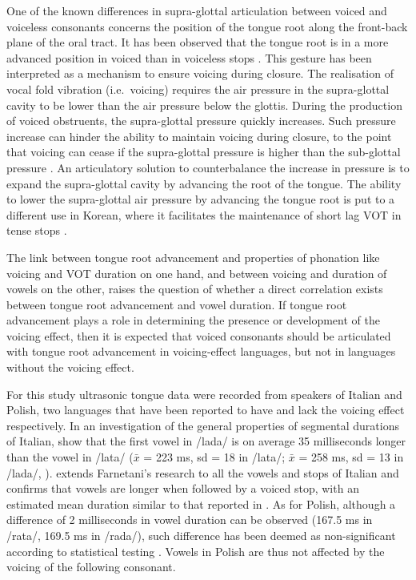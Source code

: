 \documentclass[authoryear, 5p]{elsarticle}
\begin{document}
One of the known differences in supra-glottal articulation between
voiced and voiceless consonants concerns the position of the tongue root
along the front-back plane of the oral tract. It has been observed that
the tongue root is in a more advanced position in voiced than in
voiceless stops \citep{kent1969,perkell1969,westbury1983}. This gesture
has been interpreted as a mechanism to ensure voicing during closure.
The realisation of vocal fold vibration (i.e.~voicing) requires the air
pressure in the supra-glottal cavity to be lower than the air pressure
below the glottis. During the production of voiced obstruents, the
supra-glottal pressure quickly increases. Such pressure increase can
hinder the ability to maintain voicing during closure, to the point that
voicing can cease if the supra-glottal pressure is higher than the
sub-glottal pressure \citep{ohala2011}. An articulatory solution to
counterbalance the increase in pressure is to expand the supra-glottal
cavity by advancing the root of the tongue. The ability to lower the
supra-glottal air pressure by advancing the tongue root is put to a
different use in Korean, where it facilitates the maintenance of short
lag VOT in tense stops \citep{ahn2016}.

The link between tongue root advancement and properties of phonation
like voicing and VOT duration on one hand, and between voicing and
duration of vowels on the other, raises the question of whether a direct
correlation exists between tongue root advancement and vowel duration.
If tongue root advancement plays a role in determining the presence or
development of the voicing effect, then it is expected that voiced
consonants should be articulated with tongue root advancement in
voicing-effect languages, but not in languages without the voicing
effect.

For this study ultrasonic tongue data were recorded from speakers of
Italian and Polish, two languages that have been reported to have and
lack the voicing effect respectively. In an investigation of the general
properties of segmental durations of Italian, \citet{farnetani1986} show
that the first vowel in /lada/ is on average 35 milliseconds longer than
the vowel in /lata/ (\(\bar{x}\) = 223 ms, sd = 18 in /lata/;
\(\bar{x}\) = 258 ms, sd = 13 in /lada/, \citealt[26]{farnetani1986}).
\citet{esposito2002} extends Farnetani's research to all the vowels and
stops of Italian and confirms that vowels are longer when followed by a
voiced stop, with an estimated mean duration similar to that reported in
\citet{farnetani1986}. As for Polish, although a difference of 2
milliseconds in vowel duration can be observed (167.5 ms in /rata/,
169.5 ms in /rada/), such difference has been deemed as non-significant
according to statistical testing \citep{keating1984}. Vowels in Polish
are thus not affected by the voicing of the following consonant.
\end{document}
